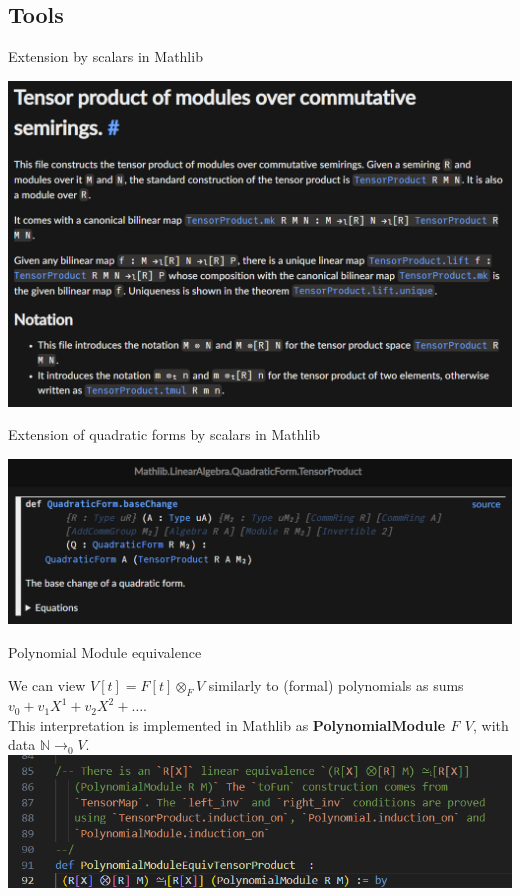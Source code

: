 \documentclass[svgnames]{beamer}
\begin{document}
\subsection{Tools}
\begin{frame}{Extension by scalars in Mathlib}

\includegraphics[width=1\linewidth]{image2.png}

\end{frame}
\begin{frame}{Extension of quadratic forms by scalars in Mathlib}


\includegraphics[width=1\linewidth]{image3.png}

\end{frame}
\begin{frame}{Polynomial Module equivalence}

We can view $V[t]=F[t] \otimes_F V$ similarly to (formal) polynomials as sums $v_0+v_1X^1+v_2X^2+\dots$. \\

\pause This interpretation is implemented in Mathlib as \textbf{PolynomialModule $F$ $V$}, with data $\mathbb N \to_0 V$. \\

\pause \includegraphics[width=1\linewidth]{image4.png}

\end{frame}
\end{document}
